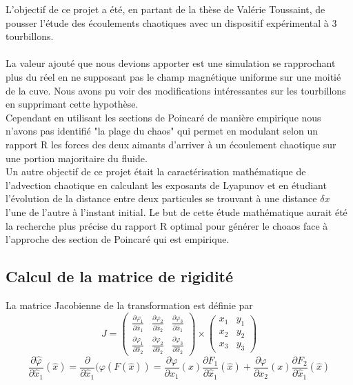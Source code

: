 \documentclass[a4paper,12pt,titlepage]{report}
\begin{document}
\begin{onehalfspace}
L'objectif de ce projet a été, en partant de la thèse de Valérie Toussaint, de pousser l'étude des écoulements chaotiques avec un dispositif expérimental à 3 tourbillons. \\
\\
La valeur ajouté que nous devions apporter est une simulation se rapprochant plus du réel en ne supposant pas le champ magnétique uniforme sur une moitié de la cuve. Nous avons pu voir des modifications intéressantes sur les  tourbillons en supprimant cette hypothèse.\\
Cependant en utilisant les sections de Poincaré de manière empirique nous n'avons pas identifié "la plage du chaos" qui permet en modulant selon un rapport R les forces des deux aimants d'arriver à un écoulement chaotique sur une portion majoritaire du fluide. \\
Un autre objectif de ce projet était la caractérisation mathématique de l'advection chaotique en calculant les exposants de Lyapunov et en étudiant l'évolution de la distance entre deux particules se trouvant à une distance $\delta x$ l'une de l'autre à l'instant initial. Le but de cette étude mathématique aurait été la recherche plus précise du rapport R optimal pour générer le choaos face à l'approche des section de Poincaré qui est empirique.

\begin{appendix}

\chapter{Calcul de la matrice de rigidité}
\label{annexe_1}

La matrice Jacobienne de la transformation est définie par
\[	
J =
\begin{pmatrix}
  \frac{\partial\varphi_{1}}{\partial \hat{x}_{1}} & \frac{\partial\varphi_{2}}{\partial \hat{x}_{2}}  & \frac{\partial\varphi_{3}}{\partial \hat{x}_{1}}\\ 
  \frac{\partial\varphi_{1}}{\partial \hat{x}_{2}} & \frac{\partial \varphi_{2}}{\partial \hat{x}_{2}} & \frac{\partial\varphi_{3}}{\partial \hat{x}_{2}} 
\end{pmatrix} 
\times
\begin{pmatrix}
   x_{1} &  y_{1} \\
   x_{2} &  y_{2} \\
   x_{3} &  y_{3}
\end{pmatrix}
\]
\[
\frac{\partial \hat{\varphi}}{\partial \hat{x}_{1}}(\hat{x}) = 
\frac{\partial}{\partial \hat{x}_{1}}(\varphi(F(\hat{x})) = 
\frac{\partial \varphi}{\partial x_{1}}(x) \frac{\partial F_{1}}{\partial \hat{x}_{1}}(\hat{x}) +
\frac{\partial \varphi}{\partial x_{2}}(x) \frac{\partial F_{2}}{\partial \hat{x}_{1}}(\hat{x})
\]


\end{appendix}
\end{onehalfspace}
\end{document}
